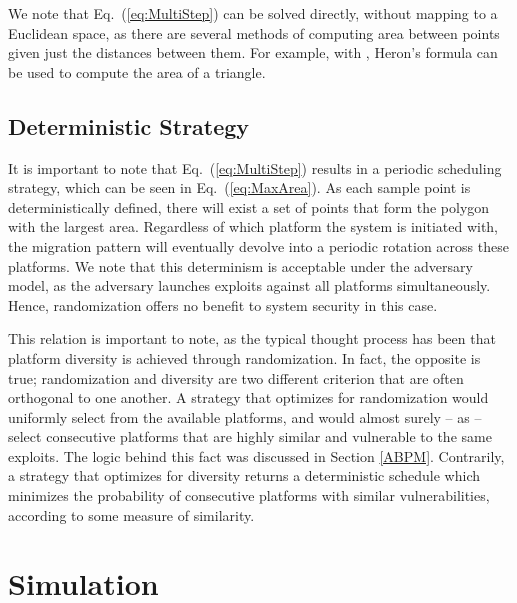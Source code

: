 \documentclass{acm_proc_article-sp}
\begin{document}
We note that Eq.\ (\ref{eq:MultiStep}) can be solved directly, without mapping to a Euclidean space, as there are several methods of computing area between points given just the distances between them. For example, with , Heron's formula can be used to compute the area of a triangle.


\subsection{Deterministic Strategy}

It is important to note that Eq.\ (\ref{eq:MultiStep}) results in a periodic scheduling strategy, which can be seen in Eq.\ (\ref{eq:MaxArea}). As each sample point  is deterministically defined, there will exist a set of  points that form the polygon with the largest area. Regardless of which platform the system is initiated with, the migration pattern will eventually devolve into a periodic rotation across these  platforms. We note that this determinism is acceptable under the adversary model, as the adversary launches exploits against all platforms simultaneously. Hence, randomization offers no benefit to system security in this case.

This relation is important to note, as the typical thought process has been that platform diversity is achieved through randomization. In fact, the opposite is true; randomization and diversity are two
different criterion that are often orthogonal to one another. A strategy that optimizes for randomization would uniformly select from the available platforms, and would almost surely -- as  -- select consecutive platforms that are highly similar and vulnerable to the same exploits. The logic behind this fact was discussed in Section \ref{ABPM}. Contrarily, a strategy that optimizes for diversity returns a deterministic schedule which minimizes the probability of consecutive platforms with similar vulnerabilities, according to some measure of similarity.


\section{Simulation}
\label{Sim}
\end{document}
